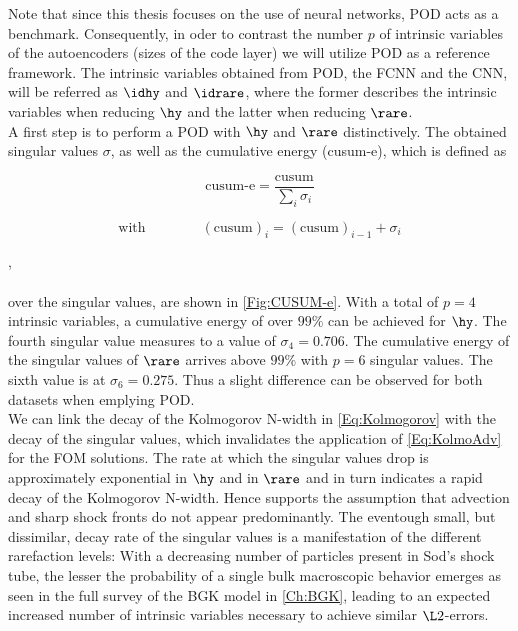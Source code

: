 Note that since this thesis focuses on the use of neural networks, POD acts as a benchmark. Consequently, in oder to contrast the number \(p\) of intrinsic variables of the autoencoders (sizes of the code layer) we will utilize POD as a reference framework. The intrinsic variables obtained from POD, the FCNN and the CNN, will be referred as \(\idhy\) and \(\idrare\), where the former describes the intrinsic variables when reducing \(\hy\) and the latter when reducing \(\rare\).\\
A first step is to perform a POD with \(\hy\) and \(\rare\) distinctively. The obtained singular values \(\sigma\), as well as the cumulative energy (cusum-e), which is defined as\\
\noindent \begin{minipage}{.3\linewidth}
	\begin{equation}
	\textrm{cusum-e} = \frac{\textrm{cusum}}{\sum_i \sigma_i}
	\end{equation}
\end{minipage}%
\begin{minipage}{.7\linewidth}
	\begin{equation}
			\textrm{with} \qquad\qquad(\textrm{cusum})_i =(\text{cusum})_{i-1} + \sigma_{i}
	\end{equation}
\end{minipage},\\\\
over the singular values, are shown in \cref{Fig:CUSUM-e}. With a total of \(p=4\) intrinsic variables, a cumulative energy of over \(99\%\) can be achieved for \(\hy\). The fourth singular value measures to a value of \(\sigma_4 = 0.706\). The cumulative energy of the singular values of \(\rare\) arrives above \(99\%\) with \(p=6\) singular values. The sixth value is at \(\sigma_6 = 0.275\). Thus a slight difference can be observed for both datasets when emplying POD.\\
We can link the decay of the Kolmogorov N-width in \cref{Eq:Kolmogorov} with the decay of the singular values, which invalidates the application of \cref{Eq:KolmoAdv} for the FOM solutions.  The rate at which the singular values drop is approximately exponential in \(\hy\) and in \(\rare\) and in turn indicates a rapid decay of the Kolmogorov N-width. Hence supports the  assumption that advection and sharp shock fronts do not appear predominantly. The eventough small, but dissimilar, decay rate of the singular values is a manifestation of the different rarefaction levels: With a decreasing number of particles present in Sod's shock tube, the lesser the probability of a single bulk macroscopic behavior emerges as seen in the full survey of the BGK model in \cref{Ch:BGK}, leading to an expected increased number of intrinsic variables necessary to achieve similar \(\L2\)-errors.  
